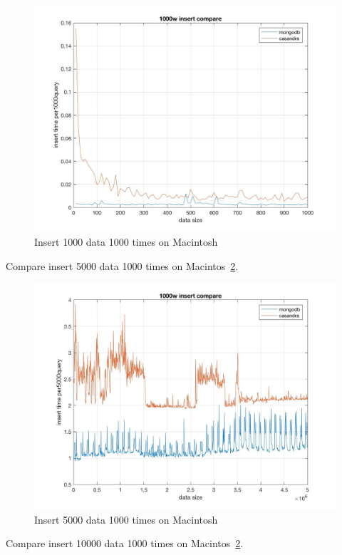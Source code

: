 \begin{figure}[!ht]
  \centering\includegraphics[width=\columnwidth]{images/insert_comp_1000.jpg}
  \caption{Insert 1000 data 1000 times on Macintosh }\label{f:fly}
\end{figure}

Compare insert 5000 data 1000 times on Macintos~\ref{f:fly}.

\begin{figure}[!ht]
  \centering\includegraphics[width=\columnwidth]
  {images/insert_comp_5000.jpg}
  \caption{Insert 5000 data 1000 times on Macintosh}\label{f:fly}
\end{figure}

Compare insert 10000 data 1000 times on Macintos~\ref{f:fly}.

